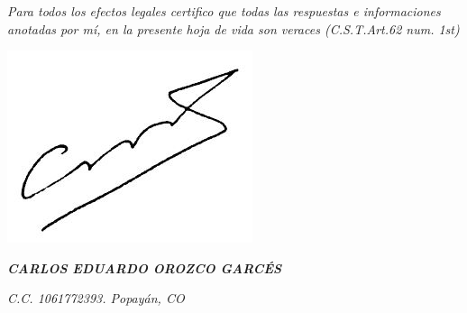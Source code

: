 \documentclass[]{cv-class}
\begin{document}
\vspace{0.5cm}
\begin{center}
	\emph{Para todos los efectos legales certifico que todas las respuestas e informaciones anotadas por mí, en la presente hoja de vida son veraces (C.S.T.Art.62 num. 1st)}
\end{center}

\begin{flushright}
    	\emph{{\includegraphics[scale=0.55]{img/firma.JPG}}}
\end{flushright}
\begin{flushright}
	\emph{\textbf{CARLOS EDUARDO OROZCO GARCÉS}}
\end{flushright}
\begin{flushright}
	\emph{C.C. 1061772393. Popayán, CO}
\end{flushright}
\end{document}
